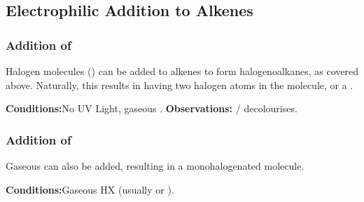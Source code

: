 

		\pagebreak
		\subsection{Electrophilic Addition to Alkenes}

			\subsubsection{Addition of }

				Halogen molecules () can be added to alkenes to form halogenoalkanes, as covered above. Naturally, this results in
				having two halogen atoms in the molecule, or a .

				\vspace{1.5em}
				\vbox{\textbf{Conditions:}\tabto{35mm}No UV Light, gaseous .}
				\vbox{\textbf{Observations:}\tabto{35mm}  /   decolourises.}


			\subsubsection{Addition of }

				Gaseous  can also be added, resulting in a monohalogenated molecule.

				\vspace{1.5em}
				\vbox{\textbf{Conditions:}\tabto{35mm}Gaseous HX (usually  or ).}


		\pagebreak
		\hypertarget{NSubAlcohols}{}
